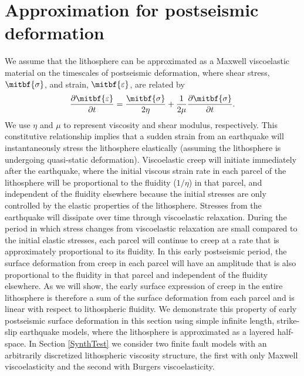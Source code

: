 \documentclass[extra,mreferee]{gji}
\begin{document}
\section{Approximation for postseismic deformation} 
We assume that the lithosphere can be approximated as a Maxwell
viscoelastic material on the timescales of postseismic deformation,
where shear stress, $\mitbf{\sigma}$, and strain,
$\mitbf{\varepsilon}$, are related by
\begin{equation}
  \frac{\partial\mitbf{\varepsilon}}{\partial t}=\frac{\mitbf{\sigma}}{2\eta} + 
                              \frac{1}{2\mu}\frac{\partial\mitbf{\sigma}}{\partial t}.
\end{equation}
We use $\eta$ and $\mu$ to represent viscosity and shear modulus,
respectively.  This constitutive relationship implies that a sudden
strain from an earthquake will instantaneously stress the lithosphere
elastically (assuming the lithosphere is undergoing quasi-static
deformation).  Viscoelastic creep will initiate immediately after the
earthquake, where the initial viscous strain rate in each parcel of
the lithosphere will be proportional to the fluidity ($1/\eta$) in
that parcel, and independent of the fluidity elsewhere because the
initial stresses are only controlled by the elastic properties of the
lithosphere.  Stresses from the earthquake will dissipate over time
through viscoelastic relaxation.  During the period in which stress
changes from viscoelastic relaxation are small compared to the initial
elastic stresses, each parcel will continue to creep at a rate that is
approximately proportional to its fluidity.  In this early postseismic
period, the surface deformation from creep in each parcel will have an
amplitude that is also proportional to the fluidity in that parcel and
independent of the fluidity elsewhere.  As we will show, the early
surface expression of creep in the entire lithosphere is therefore a
sum of the surface deformation from each parcel and is linear with
respect to lithospheric fluidity.  We demonstrate this property of
early postseismic surface deformation in this section using simple
infinite length, strike-slip earthquake models, where the lithosphere
is approximated as a layered half-space. In Section \ref{SynthTest} we
consider two finite fault models with an arbitrarily discretized
lithospheric viscosity structure, the first with only Maxwell
viscoelasticity and the second with Burgers viscoelasticity.
\end{document}
